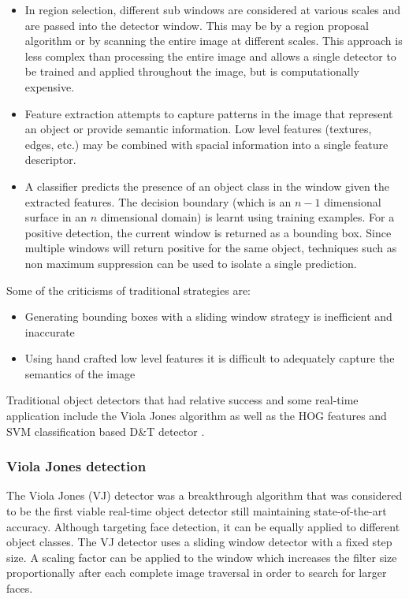 \documentclass[a4paper,twoside,12pt]{report}
\begin{document}
\begin{itemize}
    \item In region selection, different sub windows are considered at various scales and are passed into the detector window. This may be by a region proposal algorithm or by scanning the entire image at different scales. This approach is less complex than processing the entire image and allows a single detector to be trained and applied throughout the image, but is computationally expensive. 
    \item Feature extraction attempts to capture patterns in the image that represent an object or provide semantic information. Low level features (textures, edges, etc.) may be combined with spacial information into a single feature descriptor.
    \item A classifier predicts the presence of an object class in the window given the extracted features. The decision boundary (which is an $n-1$ dimensional surface in an $n$ dimensional domain) is learnt using training examples. For a positive detection, the current window is returned as a bounding box. Since multiple windows will return positive for the same object, techniques such as non maximum suppression can be used to isolate a single prediction.
\end{itemize}

\noindent Some of the criticisms of traditional strategies are: 
\begin{itemize}
    \setlength\itemsep{0em}
    \item Generating bounding boxes with a sliding window strategy is inefficient and inaccurate
    \item Using hand crafted low level features it is difficult to adequately capture the semantics of the image 
\end{itemize}

Traditional object detectors that had relative success and some real-time application include the Viola Jones algorithm \citep{vjdet} as well as the HOG features and SVM classification based D\&T detector \citep{hog}. 

\subsubsection{Viola Jones detection}

The Viola Jones (VJ) detector \cite{vjdet} was a breakthrough algorithm that was considered to be the first viable real-time object detector still maintaining state-of-the-art accuracy. Although targeting face detection, it can be equally applied to different object classes. The VJ detector uses a sliding window detector with a fixed step size. A scaling factor can be applied to the window which increases the filter size proportionally after each complete image traversal in order to search for larger faces. 
\end{document}
